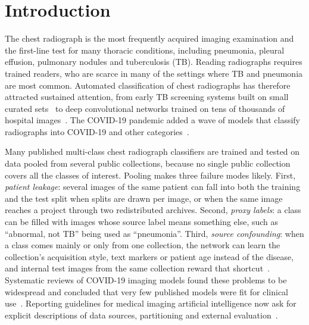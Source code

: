 \section{Introduction}
\label{sec:intro}

The chest radiograph is the most frequently acquired imaging examination and the first-line test for many thoracic conditions, including pneumonia, pleural effusion, pulmonary nodules and tuberculosis (TB). Reading radiographs requires trained readers, who are scarce in many of the settings where TB and pneumonia are most common. Automated classification of chest radiographs has therefore attracted sustained attention, from early TB screening systems built on small curated sets~\cite{jaeger2014two,candemir2014lung} to deep convolutional networks trained on tens of thousands of hospital images~\cite{wang2017chestxray8,rajpurkar2017chexnet,irvin2019chexpert,johnson2019mimic}. The COVID-19 pandemic added a wave of models that classify radiographs into COVID-19 and other categories~\cite{wang2020covidnet,apostolopoulos2020covid,chowdhury2020can}.

Many published multi-class chest radiograph classifiers are trained and tested on data pooled from several public collections, because no single public collection covers all the classes of interest. Pooling makes three failure modes likely. First, \emph{patient leakage}: several images of the same patient can fall into both the training and the test split when splits are drawn per image, or when the same image reaches a project through two redistributed archives. Second, \emph{proxy labels}: a class can be filled with images whose source label means something else, such as ``abnormal, not TB'' being used as ``pneumonia''. Third, \emph{source confounding}: when a class comes mainly or only from one collection, the network can learn the collection's acquisition style, text markers or patient age instead of the disease, and internal test images from the same collection reward that shortcut~\cite{zech2018variable,geirhos2020shortcut,degrave2021ai,maguolo2020critic}. Systematic reviews of COVID-19 imaging models found these problems to be widespread and concluded that very few published models were fit for clinical use~\cite{wynants2020prediction,roberts2021common}. Reporting guidelines for medical imaging artificial intelligence now ask for explicit descriptions of data sources, partitioning and external evaluation~\cite{mongan2020claim,collins2024tripodai}.

